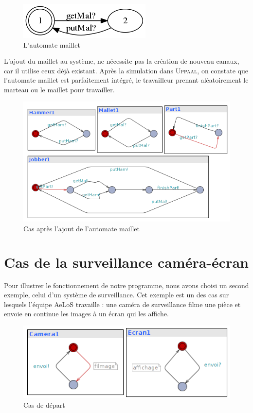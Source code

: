 \documentclass[12pt,a4paper]{report}
\begin{document}
\begin{figure}[H]
  \centering
  \includegraphics[scale=0.6]{ressources/mallet.png}
  \caption{L'automate maillet}
\end{figure}    

    L'ajout du maillet au système, ne nécessite pas la création de nouveau canaux, car 
    il utilise ceux déjà existant. Après la simulation dans \textsc{Uppaal}, on constate 
    que l'automate maillet est parfaitement intégré, le travailleur prenant
     aléatoirement le marteau ou le maillet pour travailler.

\begin{figure}[H]
  \centering
  \includegraphics[scale=0.6]{ressources/workerMallet.png}
  \caption{Cas après l'ajout de l'automate maillet}
\end{figure}  

\newpage    
    \section{Cas de la surveillance caméra-écran}

    Pour illustrer le fonctionnement de notre programme, nous avons choisi un second 
    exemple, celui d'un système de surveillance. Cet exemple est un des cas sur lesquels l'équipe 
    AeLoS travaille : une caméra de surveillance filme une pièce et envoie en continue 
    les images à un écran qui les affiche.
    
\begin{figure}[H]
  \centering
  \includegraphics[scale=0.6]{ressources/cameraBasic.png}
  \caption{Cas de départ}
\end{figure}       
\end{document}
